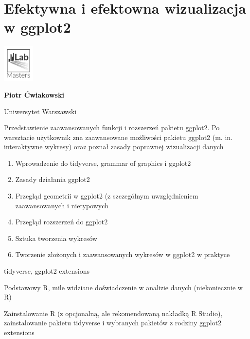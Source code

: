 \documentclass[\main/boa.tex]{subfiles}
\begin{document}
\section{Efektywna i efektowna wizualizacja w ggplot2}
\begin{minipage}[t]{0.915\textwidth}
	\center     
    \includegraphics[width=60px]{img/workshops/czarno_biale/lab.png} 
\end{minipage}

\begin{minipage}{0.915\textwidth}
\centering
{\bf {} Piotr Ćwiakowski}
\end{minipage}

\vskip 0.3cm

\begin{affiliations}
\begin{minipage}{0.915\textwidth}
\centering
\large Uniwersytet Warszawski  \\[2pt]
\end{minipage}
\end{affiliations}

\vskip 0.8cm

\opiswarsztatu Przedstawienie zaawansowanych funkcji i rozszerzeń pakietu ggplot2. Po warsztacie użytkownik zna zaawansowane możliwości pakietu ggplot2 (m. in. interaktywne wykresy) oraz poznał zasady poprawnej wizualizacji danych

\planwarsztatu
\begin{enumerate}
\item Wprowadzenie do tidyverse, grammar of graphics i ggplot2
\item Zasady działania ggplot2
\item Przegląd geometrii w ggplot2 (z szczególnym uwzględnieniem zaawansowanych i nietypowych
\item Przegląd rozszerzeń do ggplot2
\item Sztuka tworzenia wykresów
\item Tworzenie złożonych i zaawansowanych wykresów w ggplot2 w praktyce
\end{enumerate}	 

\pakiety tidyverse, ggplot2 extensions

\umiejetnosci Podstawowy R, mile widziane doświadczenie w analizie danych (niekoniecznie w R)

\wymagania Zainstalowanie R (z opcjonalną, ale rekomendowaną nakładką R Studio), zainstalowanie pakietu tidyverse i wybranych pakietów z rodziny ggplot2 extensions
\end{document}
